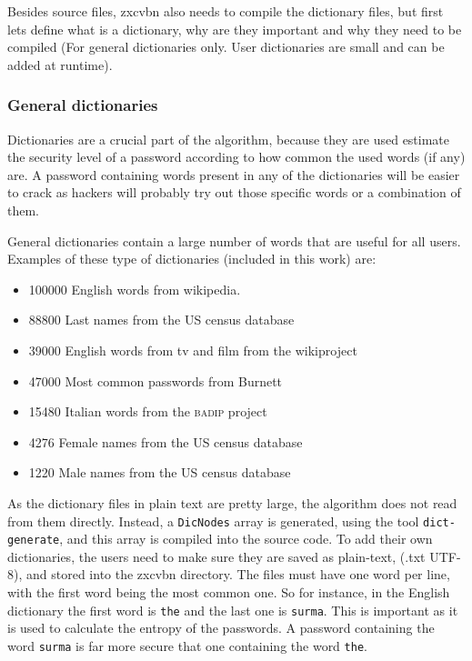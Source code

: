 Besides source files, zxcvbn also needs to compile the dictionary files, but first lets define what is a dictionary, why are they important and why they need to be compiled (For general dictionaries only. User dictionaries are small and can be added at runtime).

\subsubsection{General dictionaries}

Dictionaries are a crucial part of the algorithm, because they are used estimate the security level of a password according to how common the used words (if any) are. A password containing words present in any of the dictionaries will be easier to crack as hackers will probably try out those specific words or a combination of them.

General dictionaries contain a large number of words that are useful for all users. Examples of these type of dictionaries (included in this work) are:
\begin{itemize}
\setlength\itemsep{0pt}
\item 100000 English words from wikipedia.
\item 88800 Last names from the US census database
\item 39000 English words from tv and film from the wikiproject \cite{wiktionary}
\item 47000 Most common passwords from Burnett \cite{burnett}
\item 15480 Italian words from the \textsc{badip} project \cite{badip} 
\item 4276 Female names from the US census database 
\item 1220 Male names from the US census database
\end{itemize} 

As the dictionary files in plain text are pretty large, the algorithm does not read from them directly. Instead, a \texttt{DicNodes} array is generated, using the tool \texttt{dict-generate}, and this array is compiled into the source code.
To add their own dictionaries, the users need to make sure they are saved as plain-text, (.txt UTF-8), and stored into the zxcvbn directory. The files must have one word per line, with the first word being the most common one. So for instance, in the English dictionary the first word is \texttt{the} and the last one is \texttt{surma}. This is important as it is used to calculate the entropy of the passwords. A password containing the word \texttt{surma} is far more secure that one containing the word \texttt{the}.

